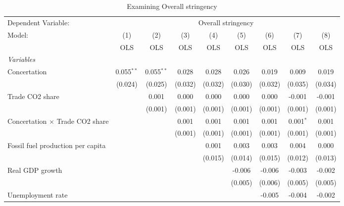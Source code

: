 
\begin{table}[htbp]
   \caption{Examining Overall stringency}
   \centering
   \begin{tabular}{lcccccccc}
      \toprule
      Dependent Variable: & \multicolumn{8}{c}{Overall stringency}\\
      Model:                                  & (1)          & (2)          & (3)     & (4)     & (5)     & (6)     & (7)         & (8)\\  
                                              &  OLS         & OLS          & OLS     & OLS     & OLS     & OLS     & OLS         & OLS\\  
      \midrule
      \emph{Variables}\\
      Concertation                            & 0.055$^{**}$ & 0.055$^{**}$ & 0.028   & 0.028   & 0.026   & 0.019   & 0.009       & 0.019\\   
                                              & (0.024)      & (0.025)      & (0.032) & (0.032) & (0.030) & (0.032) & (0.035)     & (0.034)\\   
      Trade CO2 share                         &              & 0.001        & 0.000   & 0.000   & 0.000   & 0.000   & -0.001      & -0.001\\   
                                              &              & (0.001)      & (0.001) & (0.001) & (0.001) & (0.001) & (0.001)     & (0.001)\\   
      Concertation $\times$ Trade CO2 share   &              &              & 0.001   & 0.001   & 0.001   & 0.001   & 0.001$^{*}$ & 0.001\\   
                                              &              &              & (0.001) & (0.001) & (0.001) & (0.001) & (0.001)     & (0.001)\\   
      Fossil fuel production per capita       &              &              &         & 0.001   & 0.003   & 0.003   & 0.004       & 0.000\\   
                                              &              &              &         & (0.015) & (0.014) & (0.015) & (0.012)     & (0.013)\\   
      Real GDP growth                         &              &              &         &         & -0.006  & -0.006  & -0.003      & -0.002\\   
                                              &              &              &         &         & (0.005) & (0.006) & (0.005)     & (0.005)\\   
      Unemployment rate                       &              &              &         &         &         & -0.005  & -0.004      & -0.002\\   

\end{tabular}
\end{table}
